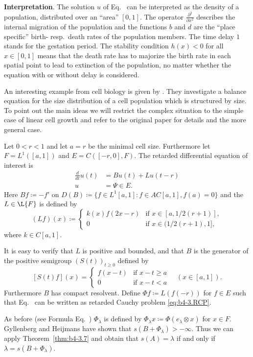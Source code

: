 \textbf{Interpretation}.\quad
	The solution $u$ of Eq.~ can be interpreted as the density of a population, distributed over an \enquote{area} $[0,1]$.
	The operator $\frac{\partial^2}{\partial x^2}$ describes the internal migration of the population and the functions $b$ and $d$ are the \enquote{place specific} birth- resp.\ death rates of the population members. 
	The time delay $1$ stands for the gestation period. 
	The stability condition $h(x) < 0$ for all $x \in [0,1]$ means that the death rate has to majorize the birth rate in each spatial point to lead to extinction of the population, no matter whether the equation with or without delay is considered.
\begin{example}\label{ex:b4-3.12}
	An interesting example from cell biology is given by \textcite{gyllenbergheijmans:1987}. 
	They investigate a balance equation for the size distribution of a cell population which is structured by size. 
	To point out the main ideas we will restrict the complex situation to the simple case of linear cell growth and refer to the original paper for details and the more general case.
	
    Let $0 < r < 1$ and let $a = r$ be the minimal cell size. 
    Furthermore let $F = L^1([a,1])$ and $E = C([-r,0],F)$. 
    The retarded differential equation of interest is 
    \begin{equation}\label{eq:b4-3.12}
            \begin{aligned}
        \frac{d}{dt}u(t) &= Bu(t) + Lu(t-r)\\
        u &= \Psi \in E.
        \end{aligned}
    \end{equation}
Here $Bf  \coloneq  -f'$ on $D(B) \coloneq \{f \in L^1[a,1] \colon f \in AC[a,1], f(a) = 0\}$ and the $L \in \L{F} $ is defined by
\[
(Lf)(x) \coloneq 
\begin{cases}
	k(x)f(2x-r) & \text{if } x \in [a,1/2(r+1)] , \\
	0 & \text{if } x \in (1/2(r+1),1] ,
\end{cases}
\]
where $k \in C[a,1]$.

It is easy to verify that $L$ is positive and bounded, and that $B$ is the generator of the positive semigroup $(S(t))_{t\geq0}$ defined by
\[
[S(t)f](x) = 
\begin{cases}
	f(x-t) & \text{if } x-t \geq a \\
	0 & \text{if } x-t < a
\end{cases}
\quad (x \in [a,1]).
\]
Furthermore $B$ has compact resolvent. 
Define $\Phi f  \coloneq  L(f(-r))$ for $f \in E$ such that Eq.~ can be written as retarded Cauchy problem \eqref{eq:b4-3.RCP}.

As before (see Formula Eq.~) $\Phi_{\lambda}$ is defined by $\Phi_{\lambda}x  \coloneq  \Phi(e_{\lambda}\otimes x)$ for $x \in F$. 
Gyllenberg and Heijmans have shown that $s(B + \Phi_{\lambda}) > -\infty$. 
Thus we can apply Theorem~\ref{thm:b4-3.7} and obtain that $s(A) = \lambda$ if and only if\/ $\lambda = s(B + \Phi_{\lambda})$.
\end{example}

